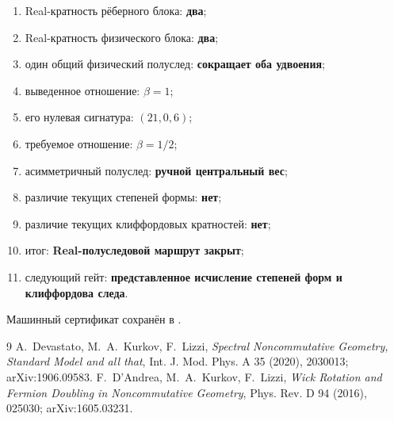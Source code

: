 \begin{protocol}
\begin{enumerate}
 \item Real-кратность рёберного блока: \textbf{два};
 \item Real-кратность физического блока: \textbf{два};
 \item один общий физический полуслед: \textbf{сокращает оба удвоения};
 \item выведенное отношение: \textbf{$\beta=1$};
 \item его нулевая сигнатура: \textbf{$(21,0,6)$};
 \item требуемое отношение: \textbf{$\beta=1/2$};
 \item асимметричный полуслед: \textbf{ручной центральный вес};
 \item различие текущих степеней формы: \textbf{нет};
 \item различие текущих клиффордовых кратностей: \textbf{нет};
 \item итог: \textbf{Real-полуследовой маршрут закрыт};
 \item следующий гейт: \textbf{представленное исчисление степеней форм и
 клиффордова следа}.
\end{enumerate}
\end{protocol}

Машинный сертификат сохранён в
.

\begin{thebibliography}{9}
A.~Devastato, M.~A.~Kurkov, F.~Lizzi,
\emph{Spectral Noncommutative Geometry, Standard Model and all that},
Int. J. Mod. Phys. A 35 (2020), 2030013; arXiv:1906.09583.
F.~D'Andrea, M.~A.~Kurkov, F.~Lizzi,
\emph{Wick Rotation and Fermion Doubling in Noncommutative Geometry},
Phys. Rev. D 94 (2016), 025030; arXiv:1605.03231.
\end{thebibliography}